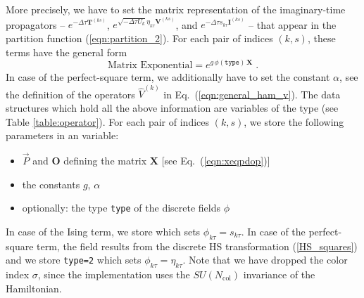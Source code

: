 \documentclass{SciPost}
\begin{document}
More precisely, we have to set the matrix representation of the imaginary-time propagators --
$ e^{-\Delta \tau {\bm T}^{(ks)}}$, $e^{  \sqrt{ -\Delta \tau  U_k} \eta_{k\tau} {\bm V}^{(ks)} }$, and $e^{  -\Delta \tau s_{k\tau}  {\bm I}^{(ks)}}$ -- that appear in the 
partition function (\ref{eqn:partition_2}).  For each pair of indices $(k,s)$, these terms have the general form
\begin{equation}\label{eqn:exponent_mat}
\text{Matrix Exponential}=
e^{g \,\phi(\texttt{type})\,\mathbf{X} }\;.
\end{equation}
In case of the  perfect-square term,  we additionally have to set the constant $\alpha$, see the definition of the operators $\hat{V}^{(k)}$ in Eq.~(\ref{eqn:general_ham_v}).
The data structures which hold all the above information are variables of the type  (see Table \ref{table:operator}). 
For each pair of indices $(k,s)$, we store the following parameters in an  variable:
\begin{itemize}
\item $\vec{P}$ and   $ \mathbf{O}$   defining the matrix $\mathbf{X}$ [see Eq.~(\ref{eqn:xeqpdop})]
\item the constants $g$, $\alpha$
\item optionally: the type \texttt{type} of the discrete fields $\phi$
\end{itemize}
In case of the Ising term,  we store  which sets $\phi_{k\tau}=s_{k\tau}$. 
In case of the perfect-square term, the field results from the discrete HS transformation (\ref{HS_squares}) and we store \texttt{type=2} which sets $\phi_{k\tau}=\eta_{k\tau}$. 
Note that we have dropped the color index $\sigma$, since the implementation uses the $SU(N_{\mathrm{col}})$ invariance of the Hamiltonian. 
\end{document}
